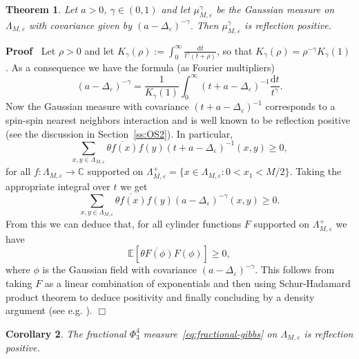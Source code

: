 \documentclass[a4paper,11pt]{article}
\newcommand{\assign}{:=}
\newcommand{\mathd}{\mathrm{d}}
\newenvironment{proof}{\noindent\textbf{Proof\ }}{\hspace*{\fill}$\Box$\medskip}
\newtheorem{theorem}{Theorem}[section]
\newtheorem{corollary}[theorem]{Corollary}
{\theorembodyfont{\rmfamily}\newtheorem{remark}[theorem]{Remark}}
\numberwithin{equation}{section}
\begin{document}
\begin{theorem}
  Let $a > 0$, $\gamma \in
  (0, 1)$ and let  $\mu_{M, \varepsilon}^{\gamma}$  be the Gaussian measure on  $\Lambda_{M, \varepsilon}$ with
  covariance given by $(a - \Delta_{\varepsilon})^{- \gamma}$. Then $\mu_{M, \varepsilon}^{\gamma}$  is reflection positive.
\end{theorem}

\begin{proof}
  Let $\rho > 0$ and let $K_{\gamma} (\rho) \assign \int_0^{\infty}
  \frac{\mathd t}{t^{\gamma} (t + \rho)}$, so that $K_{\gamma} (\rho) =
  \rho^{- \gamma} K_{\gamma} (1)$. As a consequence we have the formula (as
  Fourier multipliers)
  \[ (a - \Delta_{\varepsilon})^{- \gamma} = \frac{1}{K_{\gamma} (1)}
     \int_0^{\infty} (t + a - \Delta_{\varepsilon})^{- 1} \frac{\mathd
     t}{t^{\gamma}} . \]
  Now the Gaussian measure with covariance $(t + a - \Delta_{\varepsilon})^{-
  1}$ corresponds to a spin-spin nearest neighbors interaction and is well
  known to be reflection positive (see the discussion in Section~\ref{ss:OS2}). In
  particular,
  \[ \sum_{x, y \in \Lambda_{M, \varepsilon}} \overline{\theta f (x)} f (y) (t
     + a - \Delta_{\varepsilon})^{- 1} (x, y) \geqslant 0, \]
  for all $f : \Lambda_{M, \varepsilon} \rightarrow \mathbb{C}$ supported on
  $\Lambda_{M, \varepsilon}^+ = \{ x \in \Lambda_{M, \varepsilon} : 0 < x_1
   < M / 2 \}$. Taking the appropriate integral over $t$ we get
  \[ \sum_{x, y \in \Lambda_{M, \varepsilon}} \overline{\theta f (x)} f (y) (a
     - \Delta_{\varepsilon})^{- \gamma} (x, y) \geqslant 0. \]
  From this we can deduce that, for all cylinder functions $F$ supported on
  $\Lambda_{M, \varepsilon}^+$ we have
  \[ \mathbb{E} [\overline{\theta F (\phi)} F (\phi)] \geqslant 0, \]
  where $\phi$ is the Gaussian field with covariance $(a -
  \Delta_{\varepsilon})^{- \gamma}$. This follows from taking $F$ as a linear
  combination of exponentials and then using Schur-Hadamard product theorem to
  deduce positivity and finally concluding by a density argument (see e.g. \cite[Thm 6.2.2]{MR887102}).
\end{proof}

\begin{corollary}
  The fractional $\Phi^4_3$ measure~{\eqref{eq:fractional-gibbs}} on
  $\Lambda_{M, \varepsilon}$ is reflection positive.
\end{corollary}
\end{document}
